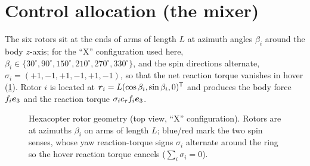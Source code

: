 \section{Control allocation (the mixer)}
\label{sec:hexa-mixer}

The six rotors sit at the ends of arms of length $L$ at azimuth angles
$\beta_i$ around the body $z$-axis; for the ``X'' configuration used here,
$\beta_i\in\{30^\circ,90^\circ,150^\circ,210^\circ,270^\circ,330^\circ\}$, and
the spin directions alternate, $\sigma_i=(+1,-1,+1,-1,+1,-1)$, so that the net
reaction torque vanishes in hover (\cref{fig:mixer}). Rotor $i$ is located at
$\bm{r}_i=L(\cos\beta_i,\sin\beta_i,0)^{\mathsf{T}}$ and produces the body force
$f_i\bm{e}_3$ and the reaction torque $\sigma_i c_\tau f_i\bm{e}_3$.

\begin{figure}[t]
\centering
{}
\caption{Hexacopter rotor geometry (top view, ``X'' configuration). Rotors are
at azimuths $\beta_i$ on arms of length $L$; blue/red mark the two spin senses,
whose yaw reaction-torque signs $\sigma_i$ alternate around the ring so the hover
reaction torque cancels ($\sum_i\sigma_i=0$).}
\label{fig:mixer}
\end{figure}

